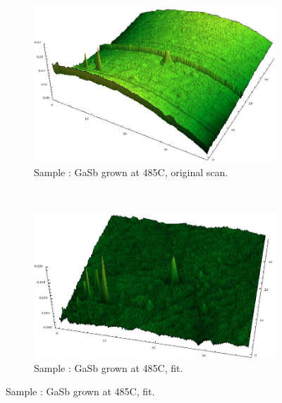 
\begin{figure}
    \centering
    \begin{subfigure}{0.45\columnwidth}
         \includegraphics[width=\textwidth]{Bilder/s1_gasb_485c_orig.jpg}
         \caption{Sample : GaSb grown at 485\textdegree C, original 
         scan.}
        \label{s1_orig}
    \end{subfigure}
    ~
    \begin{subfigure}{0.45\columnwidth}
         \includegraphics[width=\textwidth]{Bilder/s1_gasb_485c_f.jpg}
         \caption{Sample : GaSb grown at 485\textdegree C, fit.}
        \label{s1_flat}
    \end{subfigure}
     

\end{figure}

